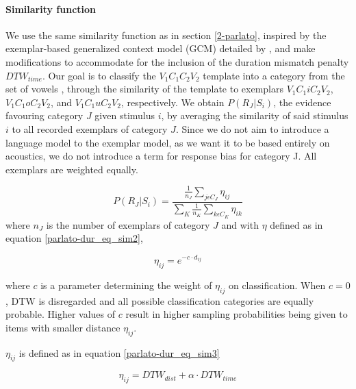 \paragraph{Similarity function}
We use the same similarity function as in section \ref{2-parlato}, inspired by the exemplar-based generalized context model (GCM) detailed by \cite{nosofsky1992}, and make modifications to accommodate for the inclusion of the duration mismatch penalty $DTW_{time}$.
Our goal is to classify the $V_{1}C_{1}C_{2}V_{2}$ template into a category from the set of vowels , through the similarity of the template to exemplars $V_{1}C_{1}iC_{2}V_{2}$, $V_{1}C_{1}oC_{2}V_{2}$, and $V_{1}C_{1}uC_{2}V_{2}$, respectively. We obtain $P(R_{J}|S_{i})$, the evidence favouring category $J$ given stimulus $i$, by averaging the similarity of said stimulus $i$ to all recorded exemplars of category $J$. Since we do not aim to introduce a language model to the exemplar model, as we want it to be based entirely on acoustics, we do not introduce a term for response bias for category J. All exemplars are weighted equally.   

{\color{red}
\begin{equation}
  P(R_{J}|S_{i}) = \frac{ \frac{1}{n_{J}} \sum_{j\epsilon C_{J}} \eta_{ij}}{\sum_{K} \frac{1}{n_{K}} \sum_{k\epsilon C_{K}} \eta_{ik}}
  \label{parlato-dur_eq_sim1}
\end{equation}
}
where $n_{J}$ is the number of exemplars of category $J$ and with $\eta$ defined as in equation \ref{parlato-dur_eq_sim2},

\begin{equation}
  \eta_{ij} = e^{-c \cdot d_{ij}}
  \label{parlato-dur_eq_sim2}
\end{equation}

where $c$ is a parameter determining the weight of $\eta_{ij}$ on classification. When $c = 0$, DTW is disregarded and all possible classification categories are equally probable. Higher values of $c$ result in higher sampling probabilities being given to items with smaller distance $\eta_{ij}$.

$\eta_{ij}$ is defined as in equation \ref{parlato-dur_eq_sim3}

\begin{equation}
  \eta_{ij} = DTW_{dist} + \alpha \cdot DTW_{time}
  \label{parlato-dur_eq_sim3}
\end{equation}

